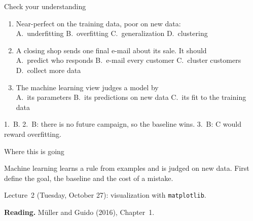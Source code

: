 \documentclass[handout,aspectratio=169,t,9pt]{beamer}
\begin{document}
\begin{frame}{Check your understanding}
  \begin{exercise}
    \begin{enumerate}[itemsep=3pt,topsep=3pt]
      \item Near-perfect on the training data, poor on new data:\\
            A.~underfitting \quad B.~overfitting \quad
            C.~generalization \quad D.~clustering
      \item A closing shop sends one final e-mail about its sale.  It
            should\\
            A.~predict who responds \quad B.~e-mail every customer \quad
            C.~cluster customers \quad D.~collect more data
      \item The machine learning view judges a model by\\
            A.~its parameters \quad B.~its predictions on new data \quad
            C.~its fit to the training data
    \end{enumerate}
  \end{exercise}

  \begin{solution}
    1.~B.  2.~B: there is no future campaign, so the baseline wins.
    3.~B: C would reward overfitting.
  \end{solution}
\end{frame}

\begin{frame}{Where this is going}
  \vspace{0.3cm}
  \begin{takeaway}
    Machine learning learns a rule from examples and is judged on new data.
    First define the goal, the baseline and the cost of a mistake.
  \end{takeaway}

  \vfill
  \begin{comingup}
    Lecture~2 (Tuesday, October 27): visualization with
    \texttt{matplotlib}.
  \end{comingup}

  \vfill
  \textbf{Reading.} M\"{u}ller and Guido (2016), Chapter~1.
\end{frame}
\end{document}
